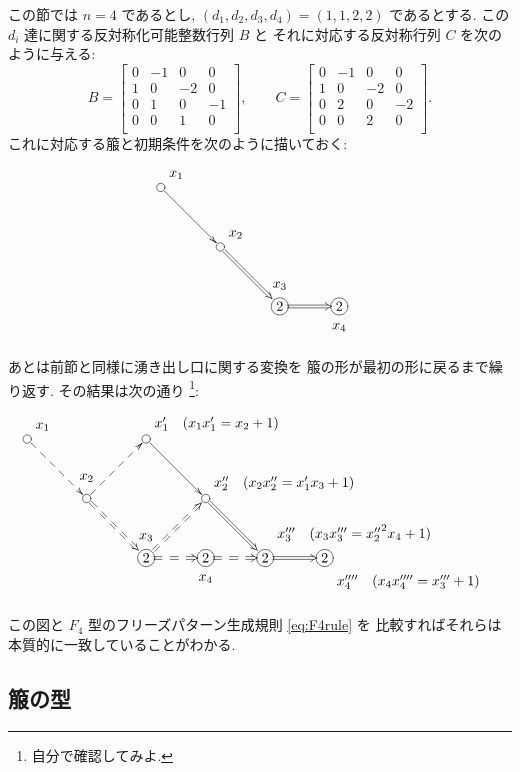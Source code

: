 \documentclass[12pt,twoside,dvipdfm]{jarticle}
\theoremstyle{definition} %
\theoremstyle{definition} %
\theoremstyle{definition} %
\numberwithin{theorem}{section}
\numberwithin{equation}{section}
\numberwithin{figure}{section}
\numberwithin{table}{section}
\begin{document}
この節では $n=4$ であるとし, 
$(d_1,d_2,d_3,d_4)=(1,1,2,2)$ であるとする.
この $d_i$ 達に関する反対称化可能整数行列 $B$ と
それに対応する反対称行列 $C$ を次のように与える:
\begin{equation*}
B =
\begin{bmatrix}
 0 &-1 & 0 & 0 \\
 1 & 0 &-2 & 0 \\
 0 & 1 & 0 &-1 \\
 0 & 0 & 1 & 0 \\
\end{bmatrix},
\qquad
C =
\begin{bmatrix}
 0 &-1 & 0 & 0 \\
 1 & 0 &-2 & 0 \\
 0 & 2 & 0 &-2 \\
 0 & 0 & 2 & 0 \\
\end{bmatrix}.
\end{equation*}
これに対応する箙と初期条件を次のように描いておく:
\[
\begin{xy}
 ( 0,30) *+[Fo]{}="1"*++!DL{x_1},
 (15,15) *+[Fo]{}="2"*++!DL{x_2},
 (30, 0) *+[Fo]{2}="3"*++++!D{x_3},
 (45, 0) *+[Fo]{2}="4"*++++!U{x_4},
 \ar@{->}"1";"2",
 \ar@2{->}"2";"3",
 \ar@2{->}"3";"4"
\end{xy}
\]
あとは前節と同様に湧き出し口に関する変換を 
箙の形が最初の形に戻るまで繰り返す.
その結果は次の通り%
\footnote{自分で確認してみよ.}:
\[
\begin{xy}
 ( 0,30) *+[Fo]{}="1"*++!DL{x_1},
 (15,15) *+[Fo]{}="2"*++++!D{x_2},
 (30, 0) *+[Fo]{2}="3"*++++!D{x_3},
 (45, 0) *+[Fo]{2}="4"*++++!U{x_4},
 (30,30) *+[Fo]{}="1'"*++!DL{x_1' \quad (x_1x_1'=x_2+1)},
 (45,15) *+[Fo]{}="2'"*++!DL{x_2'' \quad (x_2x_2''=x_1'x_3+1)},
 (60, 0) *+[Fo]{2}="3'"*++++!DL{\!\!x_3''' \quad (x_3x_3'''={x_2''}^2x_4+1)},
 (75,0) *+[Fo]{2}="4'"*++++!UL{\!\!x_4'''' \quad (x_4x_4''''=x_3'''+1)},
 \ar@{-->}"1";"2",
 \ar@2{-->}"2";"3",
 \ar@2{-->}"3";"4",
 \ar@{-->}"2";"1'",
 \ar@2{-->}"3";"2'",
 \ar@2{-->}"4";"3'",
 \ar@{->}"1'";"2'",
 \ar@2{->}"2'";"3'",
 \ar@2{->}"3'";"4'"
\end{xy}
\]
この図と $F_4$ 型のフリーズパターン生成規則 \eqref{eq:F4rule} を
比較すればそれらは本質的に一致していることがわかる.


\subsection{箙の型}
\label{sec:quiver-type}
\end{document}
